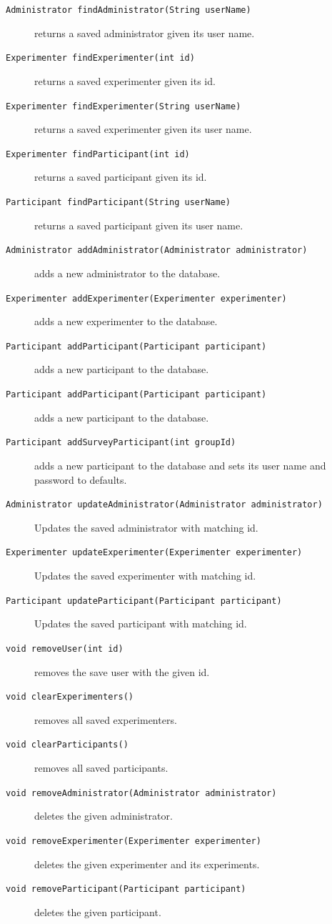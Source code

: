 \documentclass[a4paper]{usiinfbachelorproject}
\begin{document}
\begin{description}
        \item[\texttt{Administrator findAdministrator(String userName)}] returns a saved administrator given its user name.
        \item[\texttt{Experimenter findExperimenter(int id)}] returns a saved experimenter given its id.
        \item[\texttt{Experimenter findExperimenter(String userName)}] returns a saved experimenter given its user name.
        \item[\texttt{Experimenter findParticipant(int id)}] returns a saved participant given its id.
        \item[\texttt{Participant findParticipant(String userName)}] returns a saved participant given its user name.
        \item[\texttt{Administrator addAdministrator(Administrator administrator)}] adds a new administrator to the database.
        \item[\texttt{Experimenter addExperimenter(Experimenter experimenter)}] adds a new experimenter to the database.
        \item[\texttt{Participant addParticipant(Participant participant)}] adds a new participant to the database.
        \item[\texttt{Participant addParticipant(Participant participant)}] adds a new participant to the database.
        \item[\texttt{Participant addSurveyParticipant(int groupId)}] adds a new participant to the database and sets its user name and password to defaults.
        \item[\texttt{Administrator updateAdministrator(Administrator administrator)}] Updates the saved administrator with matching id.
        \item[\texttt{Experimenter updateExperimenter(Experimenter experimenter)}] Updates the saved experimenter with matching id.
        \item[\texttt{Participant updateParticipant(Participant participant)}] Updates the saved participant with matching id.
        \item[\texttt{void removeUser(int id)}] removes the save user with the given id.
        \item[\texttt{void clearExperimenters()}] removes all saved experimenters.
        \item[\texttt{void clearParticipants()}] removes all saved participants.
        \item[\texttt{void removeAdministrator(Administrator administrator)}] deletes the given administrator.
        \item[\texttt{void removeExperimenter(Experimenter experimenter)}] deletes the given experimenter and its experiments.
        \item[\texttt{void removeParticipant(Participant participant)}] deletes the given participant.

    \end{description}
\end{document}
